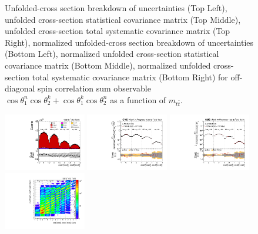 \begin{refsection}
\begin{figure}[htb]
\begin{center}
\caption{Unfolded-cross section breakdown of uncertainties (Top Left), unfolded cross-section statistical covariance matrix (Top Middle), unfolded cross-section total systematic covariance matrix (Top Right), normalized unfolded-cross section breakdown of uncertainties (Bottom Left), normalized unfolded cross-section statistical covariance matrix (Bottom Middle), normalized unfolded cross-section total systematic covariance matrix (Bottom Right) for off-diagonal spin correlation sum observable $\cos\theta_{1}^{n}\cos\theta_{2}^{k}+\cos\theta_{1}^{k}\cos\theta_{2}^{n}$ as a function of $m_{t\bar{t}}$.}
\label{fig:c_Pnk_mttbar_uncertainties}
\end{center}
\end{figure}
\clearpage
\begin{figure}[htb]
\begin{center}
 \includegraphics[width=0.32\textwidth]{fig_fullRun2UL/controlplots/combined/Hyp_LLBarCMnk_vs_TTBarMass.pdf}
 \includegraphics[width=0.32\textwidth]{fig_fullRun2UL/unfolding/combined/UnfoldedResults_c_Mnk_mttbar.pdf}
 \includegraphics[width=0.32\textwidth]{fig_fullRun2UL/unfolding/combined/UnfoldedResultsNorm_c_Mnk_mttbar.pdf} \\
 \includegraphics[width=0.32\textwidth]{fig_fullRun2UL/unfolding/combined/ResponseMatrix_c_Mnk_mttbar.pdf}

\end{center}
\end{figure}
\end{refsection}

